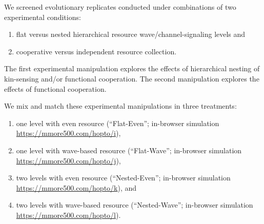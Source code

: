 We screened evolutionary replicates conducted under combinations of two experimental conditions:
\begin{enumerate}
\item flat versus nested hierarchical resource wave/channel-signaling levels and
\item cooperative versus independent resource collection.
\end{enumerate}

The first experimental manipulation explores the effects of hierarchical nesting of kin-sensing and/or functional cooperation.
The second manipulation explores the effects of functional cooperation.

We mix and match these experimental manipulations in three treatments:
\begin{enumerate}
\item one level with even resource (``Flat-Even''; in-browser simulation \url{https://mmore500.com/hopto/i}),
\item one level with wave-based resource (``Flat-Wave''; in-browser simulation \url{https://mmore500.com/hopto/j}),
\item two levels with even resource (``Nested-Even''; in-browser simulation \url{https://mmore500.com/hopto/k}), and
\item two levels with wave-based resource (``Nested-Wave''; in-browser simulation \url{https://mmore500.com/hopto/l}).
\end{enumerate}
